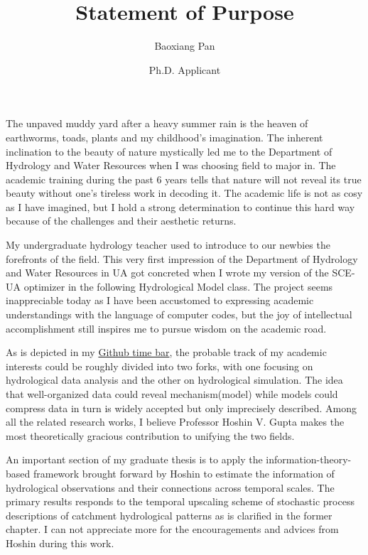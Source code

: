 \documentclass{article}
\title{Statement of Purpose}
\author{Baoxiang Pan}
\date{Ph.D. Applicant}
\begin{document}
  \maketitle%
\large{
  The unpaved muddy yard after a heavy summer rain is the heaven of earthworms, toads, plants and my childhood’s imagination. The inherent inclination to the beauty of nature mystically led me to the Department of Hydrology and Water Resources when I was choosing field to major in. The academic training during the past 6 years tells that nature will not reveal its true beauty without one's tireless work in decoding it.   The academic life is not as cosy  as I have imagined, but I hold a strong determination to continue this hard way because of the challenges and their aesthetic returns.

My undergraduate hydrology teacher used to introduce to our newbies the forefronts of the field. This very first impression of the Department of Hydrology and Water Resources in UA got concreted when I wrote my version of the SCE-UA optimizer in the following Hydrological Model class. The project seems inappreciable today as I have been accustomed to expressing academic understandings with the language of computer codes, but the joy of intellectual accomplishment  still inspires me to pursue wisdom on the academic road. 
 
As is depicted in my {\href{https://github.com/morepenn}{Github time bar}}, the probable track of my academic interests  could be roughly divided into two forks, with one focusing on hydrological data analysis and the other on hydrological simulation. The idea that well-organized data could reveal mechanism(model)  while  models could compress data in turn is widely accepted but only imprecisely described. Among all the related research works, I believe Professor Hoshin V. Gupta makes the most theoretically gracious contribution to unifying the two fields.

An important section of my graduate thesis is to apply the information-theory-based framework brought forward by Hoshin to estimate the information of hydrological observations and their connections across temporal scales. The primary results responds to the temporal upscaling scheme of stochastic process descriptions of catchment hydrological patterns as is clarified in the former chapter. I can not appreciate more for the encouragements and advices from Hoshin during this work. 

}
\end{document}
